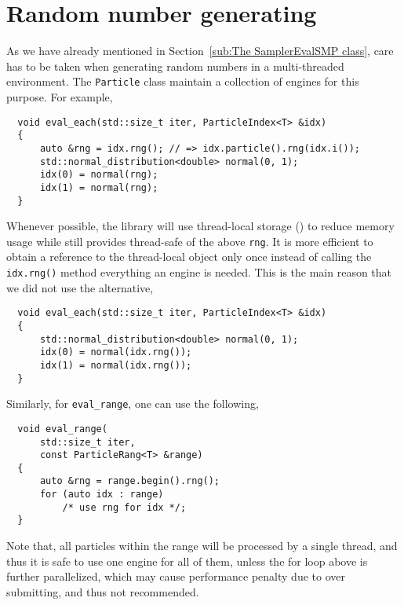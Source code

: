 \section{Random number generating}
\label{sec:Random number generating}

As we have already mentioned in Section~\ref{sub:The SamplerEvalSMP class},
care has to be taken when generating random numbers in a multi-threaded
environment. The \verb|Particle| class maintain a collection of \rng engines
for this purpose. For example,
\begin{Verbatim}
  void eval_each(std::size_t iter, ParticleIndex<T> &idx)
  {
      auto &rng = idx.rng(); // => idx.particle().rng(idx.i());
      std::normal_distribution<double> normal(0, 1);
      idx(0) = normal(rng);
      idx(1) = normal(rng);
  }
\end{Verbatim}
Whenever possible, the library will use thread-local storage (\tls) to reduce
memory usage while still provides thread-safe of the above \verb|rng|. It is
more efficient to obtain a reference to the thread-local object only once
instead of calling the \verb|idx.rng()| method everything an \rng engine is
needed. This is the main reason that we did not use the alternative,
\begin{Verbatim}
  void eval_each(std::size_t iter, ParticleIndex<T> &idx)
  {
      std::normal_distribution<double> normal(0, 1);
      idx(0) = normal(idx.rng());
      idx(1) = normal(idx.rng());
  }
\end{Verbatim}
Similarly, for \verb|eval_range|, one can use the following,
\begin{Verbatim}
  void eval_range(
      std::size_t iter,
      const ParticleRang<T> &range)
  {
      auto &rng = range.begin().rng();
      for (auto idx : range)
          /* use rng for idx */;
  }
\end{Verbatim}
Note that, all particles within the range will be processed by a single thread,
and thus it is safe to use one \rng engine for all of them, unless the for loop
above is further parallelized, which may cause performance penalty due to over
submitting, and thus not recommended.
